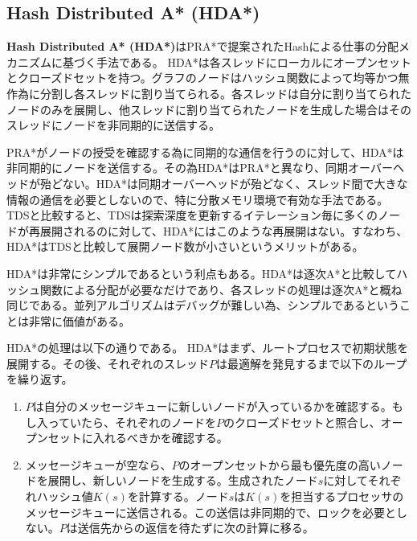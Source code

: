 \documentclass[uplatex]{jsarticle}
\begin{document}
\subsection{Hash Distributed A* (HDA*)}
\textbf{Hash Distributed A* (HDA*)}はPRA*で提案されたHashによる仕事の分配メカニズムに基づく手法である。
HDA*は各スレッドにローカルにオープンセットとクローズドセットを持つ。グラフのノードはハッシュ関数によって均等かつ無作為に分割し各スレッドに割り当てられる。各スレッドは自分に割り当てられたノードのみを展開し、他スレッドに割り当てられたノードを生成した場合はそのスレッドにノードを非同期的に送信する。

PRA*がノードの授受を確認する為に同期的な通信を行うのに対して、HDA*は非同期的にノードを送信する。その為HDA*はPRA*と異なり、同期オーバーヘッドが殆どない。HDA*は同期オーバーヘッドが殆どなく、スレッド間で大きな情報の通信を必要としないので、特に分散メモリ環境で有効な手法である。
TDSと比較すると、TDSは探索深度を更新するイテレーション毎に多くのノードが再展開されるのに対して、HDA*にはこのような再展開はない。すなわち、HDA*はTDSと比較して展開ノード数が小さいというメリットがある。

HDA*は非常にシンプルであるという利点もある。HDA*は逐次A*と比較してハッシュ関数による分配が必要なだけであり、各スレッドの処理は逐次A*と概ね同じである。並列アルゴリズムはデバッグが難しい為、シンプルであるということは非常に価値がある。
\newline



HDA*の処理は以下の通りである。
HDA*はまず、ルートプロセスで初期状態を展開する。その後、それぞれのスレッド$P$は最適解を発見するまで以下のループを繰り返す。

\begin{enumerate}
	\item $P$は自分のメッセージキューに新しいノードが入っているかを確認する。もし入っていたら、それぞれのノードを$P$のクローズドセットと照合し、オープンセットに入れるべきかを確認する。
	\item メッセージキューが空なら、$P$のオープンセットから最も優先度の高いノードを展開し、新しいノードを生成する。生成されたノード$s$に対してそれぞれハッシュ値$K(s)$を計算する。ノード$s$は$K(s)$を担当するプロセッサのメッセージキューに送信される。この送信は非同期的で、ロックを必要としない。$P$は送信先からの返信を待たずに次の計算に移る。
\end{enumerate}
\end{document}
